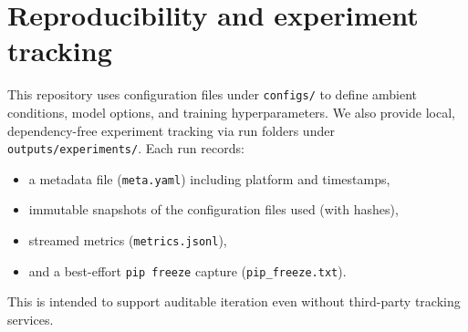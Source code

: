 \section{Reproducibility and experiment tracking}
\label{sec:reproducibility}

This repository uses configuration files under \texttt{configs/} to define
ambient conditions, model options, and training hyperparameters. We also
provide local, dependency-free experiment tracking via run folders under
\texttt{outputs/experiments/}. Each run records:
\begin{itemize}
  \item a metadata file (\texttt{meta.yaml}) including platform and timestamps,
  \item immutable snapshots of the configuration files used (with hashes),
  \item streamed metrics (\texttt{metrics.jsonl}),
  \item and a best-effort \texttt{pip freeze} capture (\texttt{pip\_freeze.txt}).
\end{itemize}

This is intended to support auditable iteration even without third-party
tracking services.

